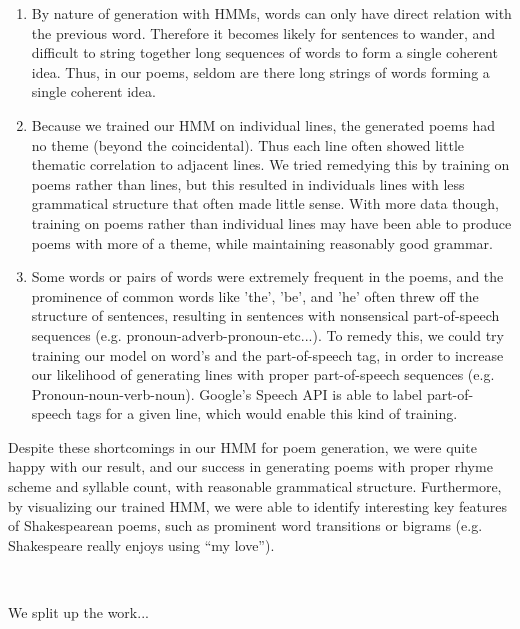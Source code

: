 \begin{enumerate}

\item By nature of generation with HMMs, words can only have direct relation with the previous word. Therefore it becomes likely for sentences to wander, and difficult to string together long sequences of words to form a single coherent idea. Thus, in our poems, seldom are there long strings of words forming a single coherent idea. 

\item Because we trained our HMM on individual lines, the generated poems had no theme (beyond the coincidental). Thus each line often showed little thematic correlation to adjacent lines. We tried remedying this by training on poems rather than lines, but this resulted in individuals lines with less grammatical structure that often made little sense. With more data though, training on poems rather than individual lines may have been able to produce poems with more of a theme, while maintaining reasonably good grammar.

\item Some words or pairs of words were extremely frequent in the poems, and the prominence of common words like 'the', 'be', and 'he' often threw off the structure of sentences, resulting in sentences with nonsensical part-of-speech sequences (e.g. pronoun-adverb-pronoun-etc...). To remedy this, we could try training our model on word's and the part-of-speech tag, in order to increase our likelihood of generating lines with proper part-of-speech sequences (e.g. Pronoun-noun-verb-noun). Google's Speech API is able to label part-of-speech tags for a given line, which would enable this kind of training.

\end{enumerate}

Despite these shortcomings in our HMM for poem generation, we were quite happy with our result, and our success in generating poems with proper rhyme scheme and syllable count, with reasonable grammatical structure. Furthermore, by visualizing our trained HMM, we were able to identify interesting key features of Shakespearean poems, such as prominent word transitions or bigrams (e.g. Shakespeare really enjoys using ``my love'').

~

We split up the work...


